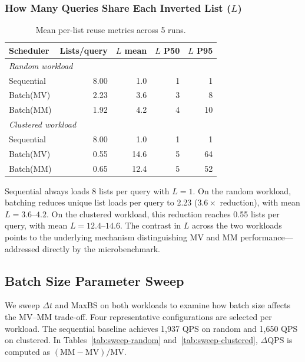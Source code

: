 \documentclass[sigconf, nonacm]{acmart}
\begin{document}
\subsubsection{How Many Queries Share Each Inverted List ($L$)}

\begin{table}
  \caption{Mean per-list reuse metrics across 5 runs.}
  \label{tab:list-sharing}
  \begin{tabular}{lrrrr}
    \toprule
    Scheduler & Lists/query & $L$ mean & $L$ P50 & $L$ P95 \\
    \midrule
    \multicolumn{5}{l}{\textit{Random workload}} \\
    \midrule
    Sequential & 8.00 & 1.0  & 1 & 1  \\
    Batch(MV)  & 2.23 & 3.6  & 3 & 8  \\
    Batch(MM)  & 1.92 & 4.2  & 4 & 10 \\
    \midrule
    \multicolumn{5}{l}{\textit{Clustered workload}} \\
    \midrule
    Sequential & 8.00 & 1.0  & 1 & 1  \\
    Batch(MV)  & 0.55 & 14.6 & 5 & 64 \\
    Batch(MM)  & 0.65 & 12.4 & 5 & 52 \\
    \bottomrule
  \end{tabular}
\end{table}

Sequential always loads 8 lists per query with $L = 1$. On the random
workload, batching reduces unique list loads per query to 2.23
($3.6\times$ reduction), with mean $L = 3.6$--$4.2$. On the clustered
workload, this reduction reaches 0.55 lists per query, with mean
$L = 12.4$--$14.6$. The contrast in $L$ across the two workloads points
to the underlying mechanism distinguishing MV and MM
performance---addressed directly by the microbenchmark.

\subsection{Batch Size Parameter Sweep}

We sweep $\Delta t$ and MaxBS on both workloads to examine how batch
size affects the MV--MM trade-off. Four representative configurations
are selected per workload. The sequential baseline achieves 1,937 QPS
on random and 1,650 QPS on clustered. In Tables~\ref{tab:sweep-random}
and~\ref{tab:sweep-clustered}, $\Delta$QPS is computed as
$(\mathrm{MM}-\mathrm{MV})/\mathrm{MV}$.
\end{document}
